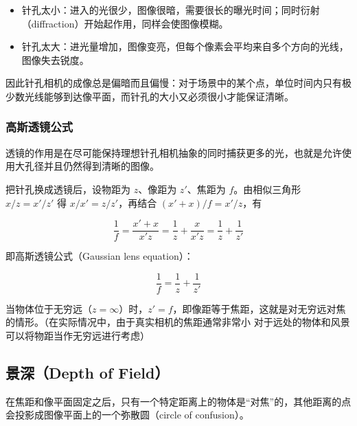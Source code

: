 \documentclass{ctexart}
\begin{document}
\begin{itemize}
    \item 针孔太小：进入的光很少，图像很暗，需要很长的曝光时间；同时衍射（diffraction）开始起作用，同样会使图像模糊。
    \item 针孔太大：进光量增加，图像变亮，但每个像素会平均来自多个方向的光线，图像失去锐度。
\end{itemize}

因此针孔相机的成像总是偏暗而且偏慢：对于场景中的某个点，单位时间内只有极少数光线能够到达像平面，而针孔的大小又必须很小才能保证清晰。

\subsubsection{高斯透镜公式}

透镜的作用是在尽可能保持理想针孔相机抽象的同时捕获更多的光，也就是允许使用大孔径并且仍然得到清晰的图像。

把针孔换成透镜后，设物距为 $z$、像距为 $z'$、焦距为 $f$。由相似三角形 $x/z = x'/z'$ 得 $x/x' = z/z'$，再结合 $(x'+x)/f = x'/z$，有

\[
\frac{1}{f} = \frac{x'+x}{x'z} = \frac{1}{z} + \frac{x}{x'z} = \frac{1}{z} + \frac{1}{z'}
\]

即高斯透镜公式（Gaussian lens equation）：

\[
\frac{1}{f} = \frac{1}{z} + \frac{1}{z'}
\]

当物体位于无穷远（$z = \infty$）时，$z' = f$，即像距等于焦距，这就是对无穷远对焦的情形。（在实际情况中，由于真实相机的焦距通常非常小
对于远处的物体和风景可以将物距当作无穷远进行考虑）

\subsection{景深（Depth of Field）}

在焦距和像平面固定之后，只有一个特定距离上的物体是“对焦”的，其他距离的点会投影成图像平面上的一个弥散圆（circle of confusion）。
\end{document}
